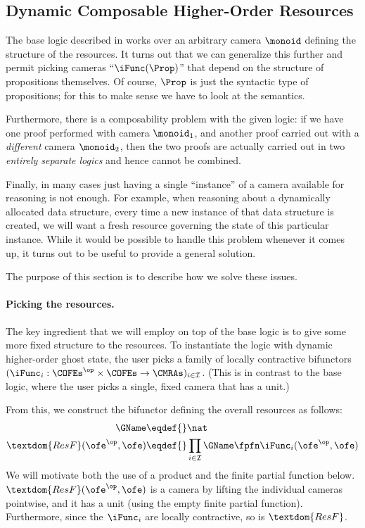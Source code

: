 \subsection{Dynamic Composable Higher-Order Resources}
\label{sec:composable-resources}

The base logic described in  works over an arbitrary camera $\monoid$ defining the structure of the resources.
It turns out that we can generalize this further and permit picking cameras ``$\iFunc(\Prop)$'' that depend on the structure of propositions themselves.
Of course, $\Prop$ is just the syntactic type of propositions; for this to make sense we have to look at the semantics.

Furthermore, there is a composability problem with the given logic: if we have one proof performed with camera $\monoid_1$, and another proof carried out with a \emph{different} camera $\monoid_2$, then the two proofs are actually carried out in two \emph{entirely separate logics} and hence cannot be combined.

Finally, in many cases just having a single ``instance'' of a camera available for reasoning is not enough.
For example, when reasoning about a dynamically allocated data structure, every time a new instance of that data structure is created, we will want a fresh resource governing the state of this particular instance.
While it would be possible to handle this problem whenever it comes up, it turns out to be useful to provide a general solution.

The purpose of this section is to describe how we solve these issues.

\paragraph{Picking the resources.}
The key ingredient that we will employ on top of the base logic is to give some more fixed structure to the resources.
To instantiate the logic with dynamic higher-order ghost state, the user picks a family of locally contractive bifunctors $(\iFunc_i : \COFEs^\op \times \COFEs \to \CMRAs)_{i \in \mathcal{I}}$.
(This is in contrast to the base logic, where the user picks a single, fixed camera that has a unit.)

From this, we construct the bifunctor defining the overall resources as follows:
\begin{align*}
  \GName \eqdef{}& \nat \\
  \textdom{ResF}(\ofe^\op, \ofe) \eqdef{}& \prod_{i \in \mathcal I} \GName \fpfn \iFunc_i(\ofe^\op, \ofe)
\end{align*}
We will motivate both the use of a product and the finite partial function below.
$\textdom{ResF}(\ofe^\op, \ofe)$ is a camera by lifting the individual cameras pointwise, and it has a unit (using the empty finite partial function).
Furthermore, since the $\iFunc_i$ are locally contractive, so is $\textdom{ResF}$.

